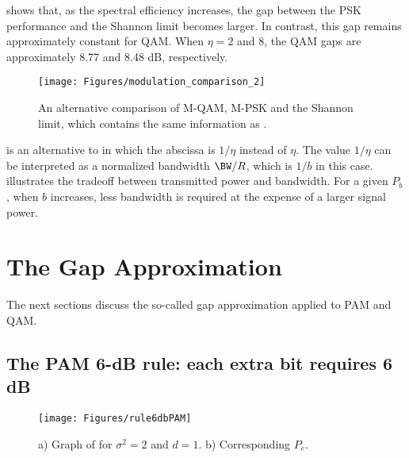  shows that, as the spectral efficiency increases, the gap between the PSK performance and the Shannon limit becomes larger. In contrast, this gap remains approximately constant for QAM. When $\eta = 2$ and 8, the QAM gaps are approximately 8.77 and 8.48 dB, respectively.

\begin{figure}[htbp]
\centering
\texttt{[image: Figures/modulation\_comparison\_2]}
\caption{An alternative comparison of M-QAM, M-PSK and the Shannon limit, which contains the same information as .\label{fig:modulation_comparison_2}}
\end{figure}

 is an alternative to  in which the abscissa is $1/\eta$ instead of $\eta$. The value $1/\eta$ can be interpreted as a normalized bandwidth $\BW/R$, which is $1/b$ in this case.  illustrates the tradeoff between transmitted power and bandwidth. For a given $P_b$, when $b$ increases, less bandwidth is required at the expense of a larger signal power.



\section{The Gap Approximation}
\label{sec:gap_approximation}

The next sections discuss the so-called gap approximation applied to PAM and QAM.

\subsection{The PAM 6-dB rule: each extra bit requires 6 dB}

\begin{figure}[htbp]
\centering
\texttt{[image: Figures/rule6dbPAM]}
\caption{a) Graph of  for $\sigma^2=2$ and $d=1$. b) Corresponding $P_e$.\label{fig:rule6dbPAM}}
\end{figure}


